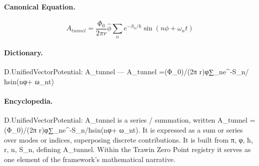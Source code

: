 \paragraph{Canonical Equation.}
\[
A_{tunnel} =\frac{\Phi_0}{2\pi r}\hat{\phi}\sum_ne^{-S_n/\hbar}\sin(n\phi+ \omega_nt)
\]

\paragraph{Dictionary.}
D.UnifiedVectorPotential: A\_tunnel — A\_tunnel =(Φ\_0)/(2π r)φ∑\_ne\textasciicircum{}-S\_n/ħsin(nφ+ ω\_nt)

\paragraph{Encyclopedia.}
D.UnifiedVectorPotential: A\_tunnel is a series / summation, written A\_tunnel =(Φ\_0)/(2π r)φ∑\_ne\textasciicircum{}-S\_n/ħsin(nφ+ ω\_nt). It is expressed as a sum or series over modes or indices, superposing discrete contributions. It is built from π, φ, ħ, r, n, S\_n, defining A\_tunnel. Within the Trawin Zero Point registry it serves as one element of the framework's mathematical narrative.
